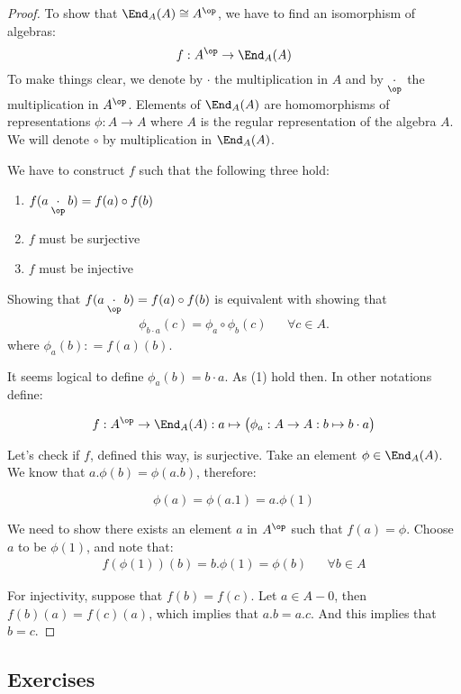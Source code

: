 \begin{proof} To show that \(\End_{A} (A) \cong  A^{\op}\), we have to find an isomorphism of algebras:
\[f :A^{\op} \rightarrow  \End_{A} (A) \]
To make things clear, we denote by \(\cdot \) the multiplication in \(A\) and by \(\underset{\op}{\cdot }\) the multiplication in \(A^{\op}\). Elements of \(\End_{A} (A)\) are homomorphisms of representations \(\phi : A\rightarrow A\) where \(A\) is the regular representation of the algebra \(A\). We will denote \(\circ \) by multiplication in \(\End_{A} (A)\). 

We have to construct \(f\) such that the following three hold:

\begin{enumerate}
\item \(f(a\underset{\op}{\cdot }b)=f(a) \circ f(b)\)
\item \(f\) must be surjective
\item \(f\) must be injective
\end{enumerate}

Showing that  \(f(a\underset{\op}{\cdot }b)=f(a) \circ f(b)\) is equivalent with showing that
\begin{align*}\phi _{b\cdot a} (c) =\phi _{a}\circ \phi _{b}(c) && \forall c \in  A.\end{align*}
where \(\phi _{a}(b): = f(a)(b)\).

It seems logical to define \(\phi_a(b) = b\cdot a\). As (1) hold then. In other notations define:

\[f :A^{\op} \rightarrow  \End_{A} (A) : a \mapsto \big(\phi _{a} : A \rightarrow  A:b \mapsto b\cdot a\big)\]

Let's check if \(f\), defined this way, is surjective. Take an element \(\phi \in  \End_{A} (A)\). We know that \(a.\phi (b)=\phi (a.b)\), therefore:

\[\phi (a)=\phi (a.1)=a.\phi (1)\]

We need to show there exists an element \(a\) in \(A^{\op}\) such that \(f(a)=\phi\). Choose \(a\) to be \(\phi(1)\), and note that:
\begin{align*} f(\phi(1))(b) = b.\phi(1) = \phi(b) && \forall b \in A \end{align*}

For injectivity, suppose that \(f(b)=f(c)\). Let \(a\in A-0\), then \(f(b)(a)=f(c)(a)\), which implies that \(a.b=a.c\). And this implies that $b=c$.
\end{proof}

\subsection*{Exercises}

